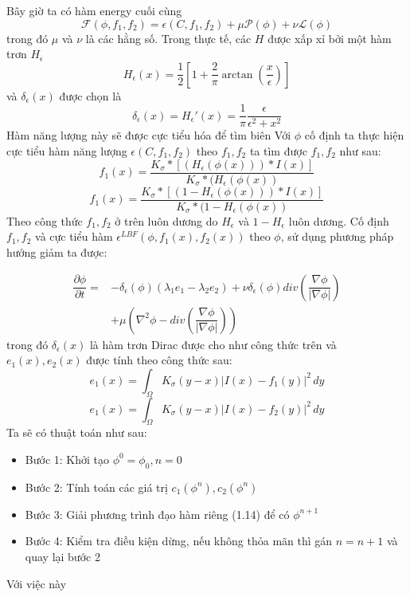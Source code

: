 \documentclass[12pt,oneside,a4]{report}
\begin{document}
Bây giờ ta có hàm energy cuối cùng
\begin{equation}
\mathcal{F}(\phi,f_1,f_2)=\epsilon(C, f_1, f_2)+\mu \mathcal{P}(\phi)+\nu \mathcal{L}(\phi)
\end{equation}
trong đó $\mu$ và $\nu$ là các hằng số. Trong thực tế, các $H$ được xấp xỉ bởi một hàm trơn $H_{\epsilon}$
\begin{equation}
H_{\epsilon}(x)=\dfrac{1}{2}[1+\dfrac{2}{\pi}\arctan(\dfrac{x}{\epsilon})]
\end{equation}
và $\delta_{\epsilon}(x)$ được chọn là
\begin{equation}
\delta_{\epsilon}(x)=H_{\epsilon}'(x)=\dfrac{1}{\pi}\dfrac{\epsilon}{\epsilon^2+x^2}
\end{equation}
Hàm năng lượng này sẽ được cực tiểu hóa để tìm biên 
Với $\phi$ cố định ta thực hiện cực tiểu hàm năng lượng $\epsilon(C, f_1, f_2)$  theo $f_1, f_2$ ta tìm được $f_1, f_2$ như sau:
\begin{equation}
f_1(x)=\dfrac{K_{\sigma}*[(H_{\epsilon}(\phi(x)))*I(x)]}{K_{\sigma}*(H_{\epsilon}(\phi(x))}
\end{equation}
\begin{equation}
f_1(x)=\dfrac{K_{\sigma}*[(1-H_{\epsilon}(\phi(x)))*I(x)]}{K_{\sigma}*(1-H_{\epsilon}(\phi(x))}
\end{equation}
Theo công thức $f_1, f_2$ ở trên luôn dương do $H_{\epsilon}$ và $1-H_{\epsilon}$ luôn dương. Cố định $f_1, f_2$ và cực tiểu hàm $\epsilon^{LBF}(\phi, f_1(x), f_2(x))$ theo $\phi$, sử dụng phương pháp hướng giảm ta được:

\begin{equation}
\begin{split}
\dfrac{\partial \phi}{\partial t}=&- \delta_{\epsilon}(\phi)(\lambda_1 e_1 -\lambda_2 e_2)+\nu \delta_{\epsilon}(\phi)div(\dfrac{\nabla \phi}{|\nabla \phi|})\\
&+\mu(\nabla^2 \phi -div(\dfrac{\nabla \phi}{|\nabla \phi|}))
\end{split}
\end{equation} 
trong đó $\delta_{\epsilon}(x)$ là hàm trơn Dirac được cho như công thức trên và $e_1(x), e_2(x)$ được tính theo công thức sau:
\begin{equation}
e_1(x)=\int_{\Omega}K_{\sigma}(y-x)|I(x)-f_1(y)|^2 \,dy
\end{equation}
\begin{equation}
e_1(x)=\int_{\Omega}K_{\sigma}(y-x)|I(x)-f_2(y)|^2 \,dy
\end{equation}
Ta sẽ có thuật toán như sau:
\begin{itemize}
\item Bước 1: Khởi tạo $\phi^0=\phi_0, n=0$
\item Bước 2: Tính toán các giá trị $c_1(\phi^n), c_2(\phi^n)$
\item Bước 3: Giải phương trình đạo hàm riêng (1.14) để có $\phi^{n+1}$
\item Bước 4: Kiểm tra điều kiện dừng, nếu không thỏa mãn thì gán $n=n+1$ và quay lại bước 2
\end{itemize}
Với việc này
\end{document}
